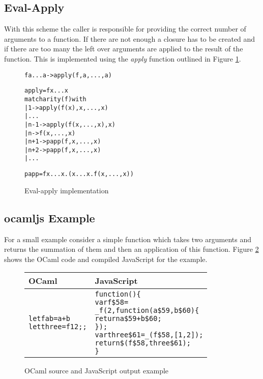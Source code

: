 \subsection{Eval-Apply}
With this scheme the caller is responsible for providing the correct number of arguments to a function. If there are not enough a closure has to be created and if there are too many the left over arguments are applied to the result of the function. This is implemented using the \emph{apply} function outlined in Figure \ref{eval-apply}.

\begin{figure}
  \begin{alltt}
f a ... a -> apply(f, a, ..., a)

apply = \lam f x ... x
  match arity(f) with
    | 1   -> apply (f(x), x, ..., x)
    | ...
    | n-1 -> apply (f(x, ..., x), x)
    | n   -> f(x, ..., x)
    | n+1 -> papp(f, x, ..., x)
    | n+2 -> papp(f, x, ..., x)
    | ...

papp = \lam f x ... x. (\lam x ... x. f(x, ..., x))
  \end{alltt}
  \caption{Eval-apply implementation}
  \label{eval-apply}
\end{figure}

\subsection{ocamljs Example}
For a small example consider a simple function which takes two arguments and returns the summation of them and then an application of this function. Figure \ref{example} shows the OCaml code and compiled JavaScript for the example.

\begin{figure}
  \begin{tabular}{| p{4cm} | p{7.3cm} |}
    \hline
    \textbf{OCaml} & \textbf{JavaScript}\\ \hline
    \begin{alltt}
let f a b = a+b
let three = f 1 2;;
    \end{alltt}
    &
    \begin{alltt}
function () \{
  var f\$58 =
    _f(2, function (a\$59, b\$60) \{
      return a\$59 + b\$60;
    \});
  var three\$61 = _(f\$58, [ 1, 2 ]);
  return \$(f\$58, three\$61);
\}
    \end{alltt} \\ \hline
  \end{tabular}
  \caption{OCaml source and JavaScript output example}
  \label{example}
\end{figure}

